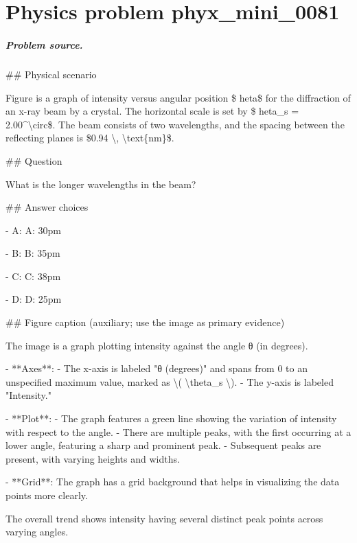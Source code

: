 
\chapter{Physics problem phyx\_mini\_0081}
\label{ch:PhyXMiniProblems_problem_phyx_mini_0081}

\paragraph{Problem source.}
\#\# Physical scenario

Figure is a graph of intensity versus angular position \$	heta\$ for the diffraction of an x-ray beam by a crystal. The horizontal scale is set by \$	heta\_s = 2.00\textasciicircum{}\textbackslash{}circ\$. The beam consists of two wavelengths, and the spacing between the reflecting planes is \$0.94 \textbackslash{}, \textbackslash{}text\{nm\}\$.

\#\# Question

What is the longer wavelengths in the beam?

\#\# Answer choices

- A: A: 30pm

- B: B: 35pm

- C: C: 38pm

- D: D: 25pm

\#\# Figure caption (auxiliary; use the image as primary evidence)

The image is a graph plotting intensity against the angle θ (in degrees). 

- **Axes**: 
  - The x-axis is labeled "θ (degrees)" and spans from 0 to an unspecified maximum value, marked as \textbackslash{}( \textbackslash{}theta\_s \textbackslash{}).
  - The y-axis is labeled "Intensity."

- **Plot**: 
  - The graph features a green line showing the variation of intensity with respect to the angle.
  - There are multiple peaks, with the first occurring at a lower angle, featuring a sharp and prominent peak.
  - Subsequent peaks are present, with varying heights and widths.

- **Grid**: The graph has a grid background that helps in visualizing the data points more clearly.

The overall trend shows intensity having several distinct peak points across varying angles.

